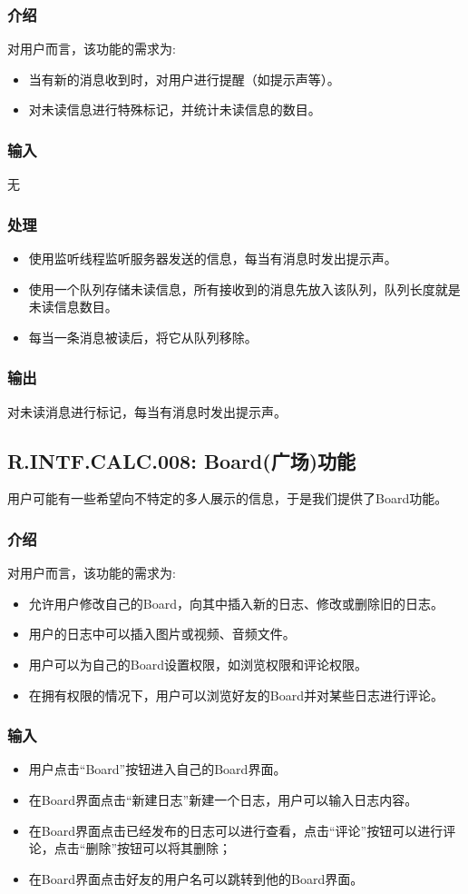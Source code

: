 \subsubsection{介绍}
对用户而言，该功能的需求为:
\begin{itemize}
  \item 当有新的消息收到时，对用户进行提醒（如提示声等）。
  \item 对未读信息进行特殊标记，并统计未读信息的数目。
\end{itemize}
\subsubsection{输入}
无
\subsubsection{处理}
\begin{itemize}
  \item 使用监听线程监听服务器发送的信息，每当有消息时发出提示声。
  \item 使用一个队列存储未读信息，所有接收到的消息先放入该队列，队列长度就是未读信息数目。
  \item 每当一条消息被读后，将它从队列移除。
\end{itemize}
\subsubsection{输出}
对未读消息进行标记，每当有消息时发出提示声。

\subsection{R.INTF.CALC.008: Board(广场)功能}
用户可能有一些希望向不特定的多人展示的信息，于是我们提供了Board功能。
\subsubsection{介绍}
对用户而言，该功能的需求为:
\begin{itemize}
  \item 允许用户修改自己的Board，向其中插入新的日志、修改或删除旧的日志。
  \item 用户的日志中可以插入图片或视频、音频文件。
  \item 用户可以为自己的Board设置权限，如浏览权限和评论权限。
  \item 在拥有权限的情况下，用户可以浏览好友的Board并对某些日志进行评论。
\end{itemize}
\subsubsection{输入}
\begin{itemize}
  \item 用户点击“Board”按钮进入自己的Board界面。
  \item 在Board界面点击“新建日志”新建一个日志，用户可以输入日志内容。
  \item 在Board界面点击已经发布的日志可以进行查看，点击“评论”按钮可以进行评论，点击“删除”按钮可以将其删除；
  \item 在Board界面点击好友的用户名可以跳转到他的Board界面。
\end{itemize}

